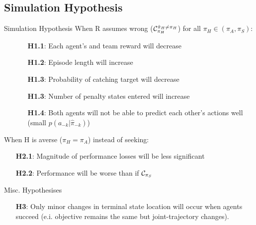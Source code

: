 \documentclass[aspectratio=1610, xcolor=dvipsnames]{packages/beamer}
\begin{document}
\subsection{Simulation Hypothesis}\label{subsec:simulation-hypothesis}
\begin{frame}{Simulation Hypothesis}
    When R assumes wrong ($\cond ^{\hat{\pi}_H \neq \pi_H}_{\pi_H}$) for all $\pi_H \in (\pi_A,\pi_S)$: %
    \begin{itemize}
        \item[]
        \begin{itemize}
            \item[\textbf{H1.1}:] Each agent's and team reward will decrease
            \item[\textbf{H1.2}:] Episode length will increase
            \item[\textbf{H1.3}:] Probability of catching target will decrease
            \item[\textbf{H1.3}:] Number of penalty states entered will increase
            \item[\textbf{H1.4}:] Both agents will not be able to predict each other's actions well (small  $p(a_{-k} | \hat{\pi}_{-k})$)
        \end{itemize}
    \end{itemize}
    When H is averse ($\pi_H = \pi_A$) instead of seeking: %
    \begin{itemize}
        \begin{itemize}
            \item[\textbf{H2.1}:] Magnitude of performance losses will be less significant
            \item[\textbf{H2.2}:] Performance will be worse than if $\cond[][S]$%
        \end{itemize}
    \end{itemize}
    Misc. Hypothesises
    \begin{itemize}
        \begin{itemize}
            \item[\textbf{H3}:] Only minor changes in terminal state location will occur when agents succeed (e.i. objective remains the same but joint-trajectory changes).
        \end{itemize}
    \end{itemize}
\end{frame}
\end{document}
